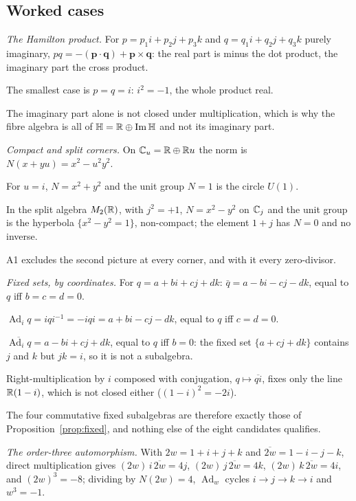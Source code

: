 \documentclass[11pt,a4paper]{article}
\theoremstyle{plain}
\theoremstyle{definition}
\theoremstyle{remark}
\newcommand{\Hquat}{\mathbb{H}}
\newcommand{\ImH}{\operatorname{Im}\Hquat}
\newcommand{\Ad}{\operatorname{Ad}}
\begin{document}
\subsection{Worked cases}\label{sec:fibre-worked}

\emph{The Hamilton product.} For $p=p_{1}i+p_{2}j+p_{3}k$ and $q=q_{1}i+q_{2}j+q_{3}k$ purely imaginary, $pq=-(\mathbf p\cdot\mathbf q)+\mathbf p\times\mathbf q$: the real part is minus the dot product, the imaginary part the cross product.

The smallest case is $p=q=i$: $i^{2}=-1$, the whole product real.

The imaginary part alone is not closed under multiplication, which is why the fibre algebra is all of $\Hquat=\R\oplus\ImH$ and not its imaginary part.

\emph{Compact and split corners.} On $\mathbb{C}_{u}=\mathbb{R}\oplus\mathbb{R} u$ the norm is $N(x+yu)=x^{2}-u^{2}y^{2}$.

For $u=i$, $N=x^{2}+y^{2}$ and the unit group $N=1$ is the circle $U(1)$.

In the split algebra $M_{2}(\mathbb{R})$, with $j^{2}=+1$, $N=x^{2}-y^{2}$ on $\mathbb{C}_{j}$ and the unit group is the hyperbola $\{x^{2}-y^{2}=1\}$, non-compact; the element $1+j$ has $N=0$ and no inverse.

A1 excludes the second picture at every corner, and with it every zero-divisor.

\emph{Fixed sets, by coordinates.} For $q=a+bi+cj+dk$: $\bar q=a-bi-cj-dk$, equal to $q$ iff $b=c=d=0$.

$\Ad_{i}q=iqi^{-1}=-iqi=a+bi-cj-dk$, equal to $q$ iff $c=d=0$.

$\overline{\Ad_{i}q}=a-bi+cj+dk$, equal to $q$ iff $b=0$: the fixed set $\{a+cj+dk\}$ contains $j$ and $k$ but $jk=i$, so it is not a subalgebra.

Right-multiplication by $i$ composed with conjugation, $q\mapsto\overline{qi}$, fixes only the line $\mathbb{R}(1-i)$, which is not closed either ($(1-i)^{2}=-2i$).

The four commutative fixed subalgebras are therefore exactly those of Proposition~\ref{prop:fixed}, and nothing else of the eight candidates qualifies.

\emph{The order-three automorphism.} With $2w=1+i+j+k$ and $\overline{2w}=1-i-j-k$, direct multiplication gives $(2w)\,i\,\overline{2w}=4j$, $(2w)\,j\,\overline{2w}=4k$, $(2w)\,k\,\overline{2w}=4i$, and $(2w)^{3}=-8$; dividing by $N(2w)=4$, $\Ad_{w}$ cycles $i\to j\to k\to i$ and $w^{3}=-1$.
\end{document}
